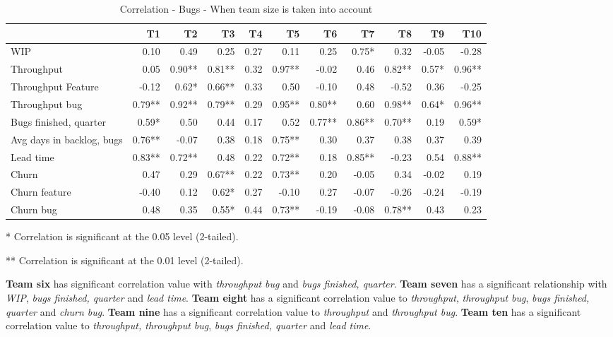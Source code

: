 \documentclass[UKenglish]{ifimaster}  %
\begin{document}
\FloatBarrier
\begin{table}[H]
  \begin{adjustwidth}{-1.5cm}{}
 \centering
 \begin{tabular}{|l|r|r|r|r|r|r|r|r|r|r|}
\hline
 &  \bf{T1} & \bf{T2} & \bf{T3} & \bf{T4} & \bf{T5} & \bf{T6} & \bf{T7} & \bf{T8} & \bf{T9} & \bf{T10}\\ \hline
 WIP  & 0.10 & 0.49 & 0.25 & 0.27 & 0.11 & 0.25 & 0.75* & 0.32 & -0.05 & -0.28 \\ \hline
 Throughput  & 0.05 & 0.90** & 0.81** & 0.32 & 0.97** & -0.02 & 0.46 & 0.82** & 0.57* & 0.96** \\ \hline
 Throughput Feature  & -0.12 & 0.62* & 0.66** & 0.33 & 0.50 & -0.10 & 0.48 & -0.52 & 0.36 & -0.25 \\ \hline
 Throughput bug  & 0.79** & 0.92** & 0.79** & 0.29 & 0.95** & 0.80** & 0.60 & 0.98** & 0.64* & 0.96** \\ \hline
 Bugs finished, quarter  & 0.59* & 0.50 & 0.44 & 0.17 & 0.52 & 0.77** & 0.86** & 0.70** & 0.19 & 0.59* \\ \hline
 Avg days in backlog, bugs  & 0.76** & -0.07 & 0.38 & 0.18 & 0.75** & 0.30 & 0.37 & 0.38 & 0.37 & 0.39 \\ \hline
 Lead time  & 0.83** & 0.72** & 0.48 & 0.22 & 0.72** & 0.18 & 0.85** & -0.23 & 0.54 & 0.88** \\ \hline
 Churn  & 0.47 & 0.29 & 0.67** & 0.22 & 0.73** & 0.20 & -0.05 & 0.34 & -0.02 & 0.19 \\ \hline
 Churn feature  & -0.40 & 0.12 & 0.62* & 0.27 & -0.10 & 0.27 & -0.07 & -0.26 & -0.24 & -0.19 \\ \hline
 Churn bug  & 0.48 & 0.35 & 0.55* & 0.44 & 0.73** & -0.19 & -0.08 & 0.78** & 0.43 & 0.23 \\ \hline
\end{tabular}
 \caption{Correlation - Bugs - When team size is taken into account}
 \label{corr:Bugs:v2}
 \centerline {* Correlation is significant at the 0.05 level (2-tailed).}
\centerline{** Correlation is significant at the 0.01 level (2-tailed).}
\end{adjustwidth}
\end{table}

\textbf{Team six} has significant correlation value with \textit{throughput bug} and \textit{bugs finished, quarter}. \textbf{Team seven} has a significant relationship with \textit{WIP}, \textit{bugs finished, quarter} and \textit{lead time}. \textbf{Team eight} has a significant correlation value to \textit{throughput}, \textit{throughput bug}, \textit{bugs finished, quarter} and \textit{churn bug}. \textbf{Team nine} has a significant correlation value to \textit{throughput} and \textit{throughput bug}. \textbf{Team ten} has a significant correlation value to \textit{throughput, throughput bug}, \textit{bugs finished, quarter} and \textit{lead time}.
\end{document}

